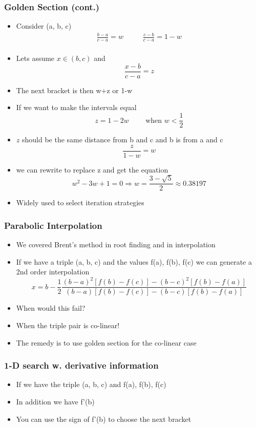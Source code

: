 \documentclass[10pt]{beamer}
\begin{document}
\begin{frame}
  \frametitle{Golden Section (cont.)}
  \begin{itemize}
  \item Consider (a, b, c)
    \[
      \begin{array}{ccc}
        \frac{b-a}{c-a} = w& ~~~~~ & \frac{c-b}{c-a} = 1-w\\
      \end{array}
    \]    
  \item Lets assume $x \in (b,c)$ and
    \[
      \frac{x-b}{c-a} = z
    \]
  \item The next bracket is then w+z or 1-w
    \pause
  \item If we want to make the intervals equal
    \[ z = 1-2w \mbox{~~~~~~ when } w < \frac{1}{2} \]
  \item $z$ should be the same distance from b and c and b is from a and c
    \[ \frac{z}{1-w} = w \]
  \item we can rewrite to replace z and get the equation
    \[ w^2 - 3w +1 = 0 \Rightarrow w = \frac{3-\sqrt{5}}{2} \approx 0.38197 \]
  \item Widely used to select iteration strategies
  \end{itemize}
\end{frame}


\begin{frame}
  \frametitle{Parabolic Interpolation}
  \begin{itemize}
  \item We covered Brent's method in root finding and in interpolation
  \item If we have a triple (a, b, c) and the values f(a), f(b), f(c) we
    can generate a 2nd order interpolation
    \[
      x = b - \frac{1}{2} \frac{(b-a)^2 [f(b)-f(c)] - (b-c)^2 [f(b)-f(a)]}{(b-a)[f(b)-f(c)] - (b-c)[f(b)-f(a)]}
    \]    
  \item When would this fail?
    \pause    
  \item When the triple pair is co-linear!
  \item The remedy is to use golden section for the co-linear case
  \end{itemize}
\end{frame}

\begin{frame}
  \frametitle{1-D search w. derivative information}
  \begin{itemize}
  \item If we have the triple (a, b, c) and f(a), f(b), f(c) 
  \item In addition we have f'(b)
  \item You can use the sign of f'(b) to choose the next bracket
  \end{itemize}
\end{frame}
\end{document}
